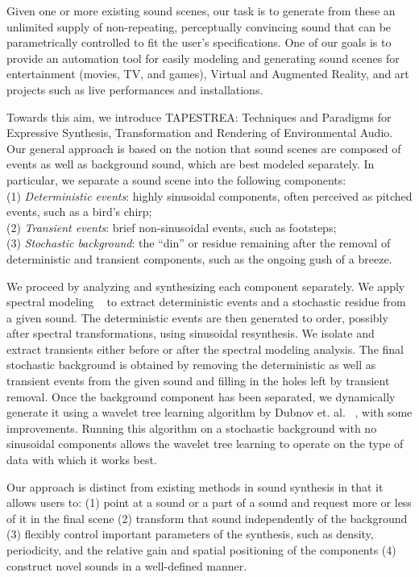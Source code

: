 \documentclass{acmsiggraph}               %
\begin{document}
Given one or more existing sound scenes, our task is to generate from 
these an unlimited supply of non-repeating, perceptually convincing 
sound that can be parametrically controlled to fit the user's 
specifications. One of our goals is to provide an automation tool for 
easily modeling and generating sound scenes for 
entertainment (movies, TV, and games), Virtual and Augmented Reality, 
and art projects such as live performances and installations.

Towards this aim, we introduce TAPESTREA: Techniques and Paradigms for 
Expressive Synthesis, Transformation and Rendering of Environmental 
Audio. Our general approach is based on the notion that sound scenes are 
composed of events as well as background sound, which are best modeled 
separately. In particular, we separate a sound scene into the following 
components:\\
(1) \emph{Deterministic events}: highly sinusoidal components, often perceived 
as pitched events, such as a bird's chirp;\\
(2) \emph{Transient events}: brief non-sinusoidal events, such as footsteps;\\
(3) \emph{Stochastic background}: the ``din'' or residue remaining after the 
removal of deterministic and transient components, such as the ongoing
gush of a breeze.

We proceed by analyzing and synthesizing each component separately. We 
apply spectral modeling ~\cite{Serra89} to extract deterministic events 
and a stochastic residue from a given sound. The deterministic events are 
then generated to order, possibly after spectral transformations, using 
sinusoidal resynthesis. We isolate and extract transients either before or 
after the spectral modeling analysis. The final stochastic background is 
obtained by removing the deterministic as well as transient events 
from the given sound and filling in the holes left by transient removal. 
Once the background component has been separated, we dynamically 
generate it using a wavelet tree learning algorithm by Dubnov et. al. 
~, with some improvements. Running this algorithm 
on a stochastic background with no sinusoidal components allows the wavelet 
tree learning to operate on the type of data with which it works best.  

Our approach is distinct from existing methods in sound synthesis in that it allows users to:
(1) point at a sound or a part of a sound and request more or less of it in the final scene
(2) transform that sound independently of the background
(3) flexibly control important parameters of the synthesis, such as density, periodicity, and the relative gain 
and spatial positioning of the components
(4) construct novel sounds in a well-defined manner.
\end{document}
